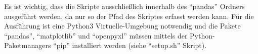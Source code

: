 Es ist wichtig, dass die Skripte ausschließlich innerhalb des "`pandas"' Ordners ausgeführt werden, da nur so der Pfad des Skriptes erfasst werden kann. Für die Ausführung ist eine Python3 Virtuelle-Umgebung notwendig und die Pakete "`pandas"', "`matplotlib"' und "`openpyxl"' müssen mittels der Python-Paketmanagers "`pip"' installiert werden (siehe "`setup.sh"' Skript).